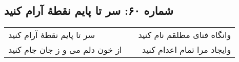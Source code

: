 \begin{center}
\section*{شماره ۶۰: سر تا پایم نقطۀ آرام کنید}
\label{sec:060}
\begin{longtable}{l p{0.5cm} r}
سر تا پایم نقطهٔ آرام کنید
&&
وانگاه فنای مطلقم نام کنید
\\
از خون دلم می و ز جان جام کنید
&&
وایجاد مرا تمام اعدام کنید
\\
\end{longtable}
\end{center}
